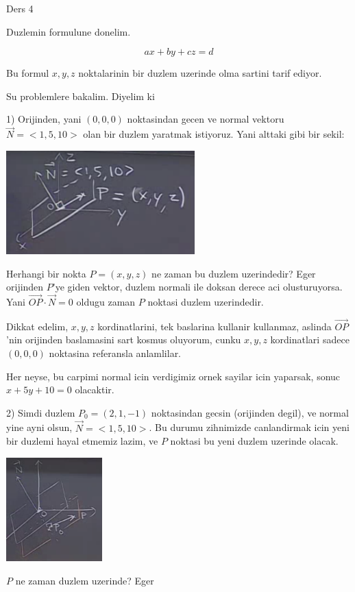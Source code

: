 \documentclass[12pt,fleqn]{article}
\begin{document}
Ders 4

Duzlemin formulune donelim. 

\[ ax + by + cz = d \]

Bu formul $x,y,z$ noktalarinin bir duzlem uzerinde olma sartini tarif
ediyor. 

Su problemlere bakalim. Diyelim ki 

1) Orijinden, yani $(0,0,0)$ noktasindan gecen ve normal vektoru $\vec{N} = <1,5,10>$
olan bir duzlem yaratmak istiyoruz. Yani alttaki gibi bir sekil:

\includegraphics[height=4cm]{4_1.png}

Herhangi bir nokta $P = (x,y,z)$  ne zaman bu duzlem uzerindedir? Eger
orijinden $P$'ye giden vektor, duzlem normali ile doksan derece aci
olusturuyorsa. Yani $\vec{OP} \cdot \vec{N} = 0$ oldugu zaman $P$ noktasi
duzlem uzerindedir. 

Dikkat edelim, $x,y,z$ kordinatlarini, tek baslarina kullanir kullanmaz,
aslinda $\vec{OP}$'nin orijinden baslamasini sart kosmus oluyorum, cunku
$x,y,z$ kordinatlari sadece $(0,0,0)$ noktasina referansla anlamlilar. 

Her neyse, bu carpimi normal icin verdigimiz ornek sayilar icin yaparsak,
sonuc $x+5y+10 = 0$ olacaktir.

2) Simdi duzlem $P_0 = (2,1,-1)$ noktasindan gecsin (orijinden degil), ve
normal yine ayni olsun, $\vec{N} = <1,5,10>$. Bu durumu zihnimizde
canlandirmak icin yeni bir duzlemi hayal etmemiz lazim, ve $P$ noktasi bu
yeni duzlem uzerinde olacak.

\includegraphics[height=4cm]{4_2.png}

$P$ ne zaman duzlem uzerinde? Eger 
\end{document}
